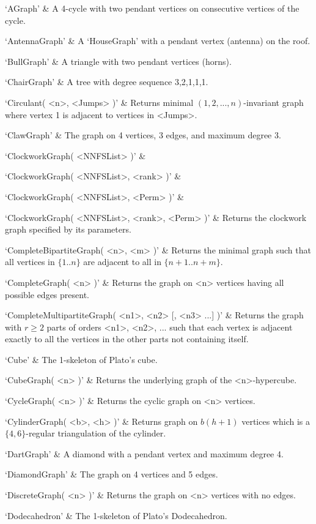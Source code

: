 \beginitems
`AGraph' & 
A 4-cycle with two pendant vertices on consecutive vertices of the cycle.

`AntennaGraph' & 
A `HouseGraph' with a pendant vertex (antenna) on the roof.

`BullGraph' & 
A triangle with two pendant vertices (horns).

`ChairGraph' & 
A tree with degree sequence 3,2,1,1,1.

`Circulant( <n>, <Jumps> )' & 
Returns minimal $(1, 2, ..., n)$-invariant graph where vertex 1 is adjacent to vertices in <Jumps>.

`ClawGraph' & 
The graph on 4 vertices, 3 edges, and maximum degree 3.

`ClockworkGraph( <NNFSList> )' &

`ClockworkGraph( <NNFSList>, <rank> )' &

`ClockworkGraph( <NNFSList>, <Perm> )' &

`ClockworkGraph( <NNFSList>, <rank>, <Perm> )' &
Returns the clockwork graph specified by its parameters.

`CompleteBipartiteGraph( <n>, <m> )' & 
Returns the minimal graph such that all vertices in $\{1..n\}$ are adjacent to all in $\{n+1..n+m\}$.

`CompleteGraph( <n> )' & 
Returns the graph on <n> vertices having all possible edges present.

`CompleteMultipartiteGraph( <n1>, <n2> [, <n3> ...] )' & 
Returns the graph with $r\geq 2$ parts of orders <n1>, <n2>, ... such that each vertex is adjacent exactly to all the vertices in the other parts not containing itself.

`Cube' & 
The 1-skeleton of Plato's cube.

`CubeGraph( <n> )' & 
Returns the underlying graph of the <n>-hypercube.

`CycleGraph( <n> )' & 
Returns the cyclic graph on <n> vertices. 

`CylinderGraph( <b>, <h> )' & 
Returns graph on $b(h+1)$ vertices which is a $\{4,6\}$-regular triangulation of the cylinder.

`DartGraph' & 
A diamond with a pendant vertex and maximum degree 4.

`DiamondGraph' & 
The graph on 4 vertices and 5 edges.

`DiscreteGraph( <n> )' & 
Returns the graph on <n> vertices with no edges.

`Dodecahedron' & 
The 1-skeleton of Plato's Dodecahedron.

